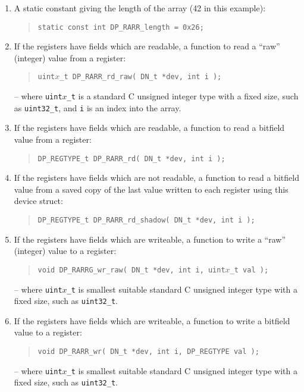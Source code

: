\documentclass[a4paper,11pt,twoside]{report}
\begin{document}
\begin{enumerate}

\item A static constant giving the length of the array (42 in this example):
  \begin{quote}
    \texttt{static const int DP\_RARR\_length = 0x26;}
  \end{quote}

\item If the registers have fields which are readable, a function to
  read a ``raw'' (integer) value from a register:
  \begin{quote}
    \texttt{uint$x$\_t DP\_RARR\_rd\_raw( DN\_t *dev, int i );}
  \end{quote}
  -- where \texttt{uint$x$\_t} is a standard C unsigned integer type
  with a fixed size, such as \texttt{uint32\_t}, and \texttt{i} is an
  index into the array.

\item If the registers have fields which are readable, a function to
  read a bitfield value from a register:
  \begin{quote}
    \texttt{DP\_REGTYPE\_t  DP\_RARR\_rd( DN\_t *dev, int i );}
  \end{quote}

\item If the registers have fields which are not readable, a function to
  read a bitfield value from a saved copy of the last value written to
  each register using this device struct:
  \begin{quote}
    \texttt{DP\_REGTYPE\_t  DP\_RARR\_rd\_shadow( DN\_t *dev, int i );}
  \end{quote}

\item If the registers have fields which are writeable, a function to
  write a ``raw'' (integer) value to a register:
  \begin{quote}
    \texttt{void DP\_RARRG\_wr\_raw( DN\_t *dev, int i,  uint$x$\_t val );}
  \end{quote}
  -- where \texttt{uint$x$\_t} is smallest suitable standard C
  unsigned integer type with a fixed size, such as
  \texttt{uint32\_t}.

\item If the registers have fields which are writeable, a function to
  write a bitfield value to a register:
  \begin{quote}
    \texttt{void DP\_RARR\_wr( DN\_t *dev, int i,  DP\_REGTYPE val );}
  \end{quote}
  -- where \texttt{uint$x$\_t} is smallest suitable standard C
  unsigned integer type with a fixed size, such as
  \texttt{uint32\_t}. 
  

\end{enumerate}
\end{document}
